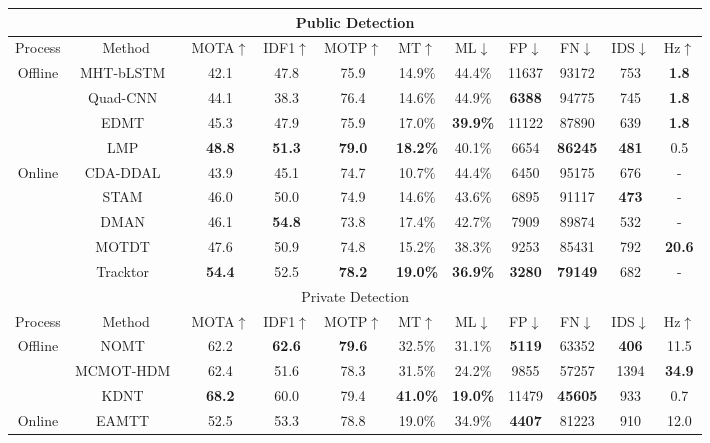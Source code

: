 \documentclass[../arXiv_main.tex]{subfiles}
\begin{document}
\begin{table}[t!]
{{\begin{tabular}{|c|c|cccccccc|c|}
\hline
\multicolumn{11}{|c|}{Public Detection} \\
\hline
Process & Method & MOTA$\uparrow$ & IDF1$\uparrow$ & MOTP$\uparrow$ & MT$\uparrow$ & ML$\downarrow$ & FP$\downarrow$ & FN$\downarrow$ & IDS$\downarrow$ & Hz$\uparrow$\\
\hline
\multirow{4}{*}{Offline}& MHT-bLSTM~\cite{kim2018multi} & 42.1 & 47.8 & 75.9 & 14.9\% & 44.4\% & 11637 & 93172 & 753 & {\bf 1.8}\\
& Quad-CNN~\cite{son2017multi} & 44.1 & 38.3 & 76.4 & 14.6\% & 44.9\% & {\bf 6388} & 94775 & 745 & {\bf 1.8}\\
& EDMT~\cite{chen2017enhancing} & 45.3 & 47.9 & 75.9 & 17.0\% & {\bf 39.9\%} & 11122 & 87890 & 639 & {\bf 1.8}\\
& LMP~\cite{tang2017multiple} & {\bf 48.8} & {\bf 51.3}  & {\bf 79.0} & {\bf 18.2\%} & 40.1\% & 6654 & {\bf 86245} & {\bf 481} & 0.5\\
\hline
\multirow{5}{*}{Online}& CDA-DDAL~\cite{bae2018confidence} & 43.9 & 45.1 & 74.7 & 10.7\% & 44.4\% & 6450 & 95175 & 676 & -\\
& STAM~\cite{chu2017online} & 46.0 & 50.0 & 74.9 & 14.6\% & 43.6\% & 6895 & 91117 & {\bf 473} & -\\
& DMAN~\cite{zhu2018online} & 46.1 & {\bf 54.8} & 73.8 & 17.4\% & 42.7\% & 7909 & 89874 & 532 & -\\
& MOTDT~\cite{chen2018real} & 47.6 & 50.9 & 74.8 & 15.2\% & 38.3\% & 9253 & 85431 & 792 & {\bf 20.6}\\
& Tracktor~\cite{bergmann2019tracking} & {\bf 54.4} & 52.5 & {\bf 78.2} & {\bf 19.0\%} & {\bf 36.9\%} & {\bf 3280} & {\bf 79149} & 682 & -\\
\hline
\hline
\multicolumn{11}{|c|}{Private Detection} \\
\hline
Process & Method & MOTA$\uparrow$ & IDF1$\uparrow$ & MOTP$\uparrow$ & MT$\uparrow$ & ML$\downarrow$ & FP$\downarrow$ & FN$\downarrow$ & IDS$\downarrow$ & Hz$\uparrow$\\
\hline
\multirow{3}{*}{Offline}& NOMT~\cite{choi2015near} & 62.2 & {\bf 62.6} & {\bf 79.6} & 32.5\% & 31.1\% & {\bf 5119} & 63352 & {\bf 406} & 11.5\\
& MCMOT-HDM~\cite{lee2016multi} & 62.4 & 51.6 & 78.3 & 31.5\% & 24.2\% & 9855 & 57257 & 1394 & {\bf 34.9}\\
& KDNT~\cite{yu2016poi} & {\bf 68.2} & 60.0 & 79.4 & {\bf 41.0\%} & {\bf 19.0\%} & 11479 & {\bf 45605} & 933 & 0.7\\
\hline
\multirow{5}{*}{Online}& EAMTT~\cite{sanchez2016online} & 52.5 & 53.3 & 78.8 & 19.0\% & 34.9\% & {\bf 4407} & 81223 & 910 & 12.0\\

\end{tabular}}}
\end{table}
\end{document}
